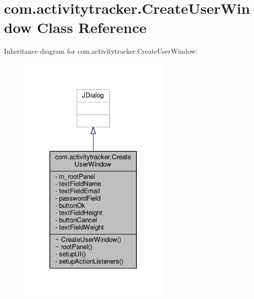 \hypertarget{classcom_1_1activitytracker_1_1_create_user_window}{}\section{com.\+activitytracker.\+Create\+User\+Window Class Reference}
\label{classcom_1_1activitytracker_1_1_create_user_window}


Inheritance diagram for com.\+activitytracker.\+Create\+User\+Window\+:
\nopagebreak
\begin{figure}[H]
\begin{center}
\leavevmode
\includegraphics[width=212pt]{classcom_1_1activitytracker_1_1_create_user_window__inherit__graph}
\end{center}
\end{figure}


